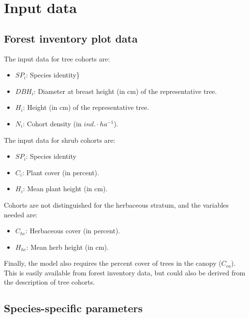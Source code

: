 \documentclass[]{book}
\providecommand{\tightlist}{%
  \setlength{\itemsep}{0pt}\setlength{\parskip}{0pt}}
\begin{document}
\hypertarget{input-data-1}{%
\section{Input data}\label{input-data-1}}

\hypertarget{forest-inventory-plot-data}{%
\subsection{Forest inventory plot data}\label{forest-inventory-plot-data}}

The input data for tree cohorts are:

\begin{itemize}
\tightlist
\item
  \(SP_i\): Species identity\}
\item
  \(DBH_i\): Diameter at breast height (in cm) of the representative tree.
\item
  \(H_i\): Height (in cm) of the representative tree.
\item
  \(N_i\): Cohort density (in \(ind.\cdot ha^{-1}\)).
\end{itemize}

The input data for shrub cohorts are:

\begin{itemize}
\tightlist
\item
  \(SP_i\): Species identity
\item
  \(C_i\): Plant cover (in percent).
\item
  \(H_i\): Mean plant height (in cm).
\end{itemize}

Cohorts are not distinguished for the herbaceous stratum, and the variables needed are:

\begin{itemize}
\tightlist
\item
  \(C_{he}\): Herbaceous cover (in percent).
\item
  \(H_{he}\): Mean herb height (in cm).
\end{itemize}

Finally, the model also requires the percent cover of trees in the canopy (\(C_{ca}\)). This is easily available from forest inventory data, but could also be derived from the description of tree cohorts.

\hypertarget{species-specific-parameters}{%
\subsection{Species-specific parameters}\label{species-specific-parameters}}
\end{document}
